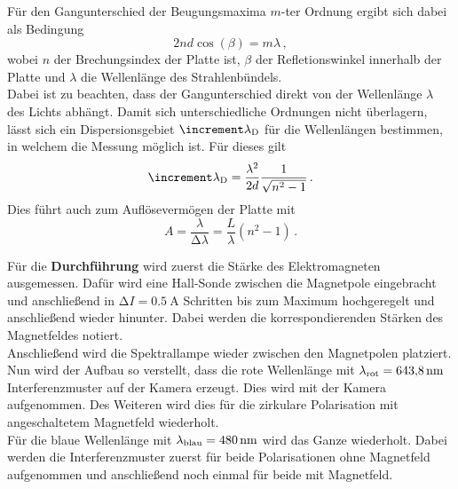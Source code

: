 \noindent
Für den Gangunterschied der Beugungsmaxima $m$-ter Ordnung ergibt sich dabei als Bedingung
\begin{equation}
    2nd \cos (\beta) = m \lambda \, ,
    \label{eqn:platte}
\end{equation}
wobei $n$ der Brechungsindex der Platte ist, $\beta$ der Refletionswinkel innerhalb der Platte und $\lambda$ die Wellenlänge des Strahlenbündels.\\
Dabei ist zu beachten, dass der Gangunterschied direkt von der Wellenlänge $\lambda$ des Lichts abhängt.
Damit sich unterschiedliche Ordnungen nicht überlagern, lässt sich ein Dispersionsgebiet $\increment \lambda_\t{D}$ für die Wellenlängen bestimmen, 
in welchem die Messung möglich ist.
Für dieses gilt
\begin{equation}
    \increment \lambda_\t{D} = \frac{\lambda^2}{2d}\frac{1}{\sqrt{n^2 -1}} \, .
    \label{eqn:dispgebiet}
\end{equation} 
Dies führt auch zum Auflösevermögen der Platte mit 
\begin{equation*}
    A = \frac{\lambda}{\increment \lambda} = \frac{L}{\lambda} (n^2 -1) \, .
\end{equation*}


\noindent
Für die \textbf{Durchführung} wird zuerst die Stärke des Elektromagneten ausgemessen. 
Dafür wird eine Hall-Sonde zwischen die Magnetpole eingebracht und anschließend in $\increment I = \SI{0.5}{\ampere}$ 
Schritten bis zum Maximum hochgeregelt und anschließend wieder hinunter. Dabei werden die korrespondierenden Stärken des Magnetfeldes notiert.\\
Anschließend wird die Spektrallampe wieder zwischen den Magnetpolen platziert.
Nun wird der Aufbau so verstellt, dass die rote Wellenlänge mit $\lambda_{\text{rot}} = \SI{643.8}{\nano\metre}$ \cite{V27} Interferenzmuster auf der Kamera erzeugt.
Dies wird mit der Kamera aufgenommen. Des Weiteren wird dies für die zirkulare Polarisation mit angeschaltetem Magnetfeld wiederholt.\\
Für die blaue Wellenlänge mit $\lambda_{\text{blau}} = \SI{480}{\nano\metre}$ \cite{V27} wird das Ganze wiederholt. 
Dabei werden die Interferenzmuster zuerst für beide Polarisationen ohne Magnetfeld aufgenommen und anschließend noch einmal für beide mit Magnetfeld.